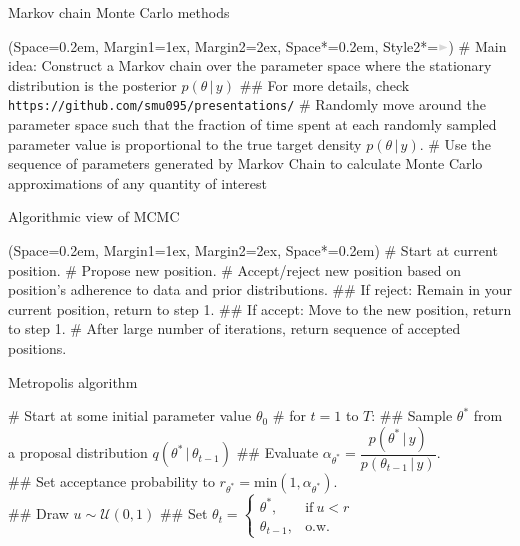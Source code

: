 \documentclass[12pt, aspectratio=149]{beamer}
\newcommand{\listSpace}{0.2em}
\theoremstyle{plain}
\begin{document}
\begin{frame}[fragile]{Markov chain Monte Carlo methods}
	\begin{easylist}
		\ListProperties(Space=\listSpace, Margin1=1ex, Margin2=2ex, Space*=\listSpace, Style2*=$\color{bggraydark}\blacktriangleright$\space)
		# Main idea: Construct a Markov chain over the parameter space where the stationary distribution is the posterior $p(\theta \,\vert\, y)$
		## For more details, check \footnotesize\texttt{https://github.com/smu095/presentations/}
		# Randomly move around the parameter space such that the fraction of time spent at each randomly sampled parameter value is proportional to the true target density $p(\theta \,\vert\,y)$.
		# Use the sequence of parameters generated by Markov Chain to calculate Monte Carlo approximations of any quantity of interest
	\end{easylist}
\end{frame}

\begin{frame}[fragile]{Algorithmic view of MCMC}
	\begin{easylist}[enumerate]
		\ListProperties(Space=\listSpace, Margin1=1ex, Margin2=2ex, Space*=\listSpace)
		# Start at current position.
		# Propose new position.
		# Accept/reject new position based on position's adherence to data and prior distributions.
		## If reject: Remain in your current position, return to step 1.
		## If accept: Move to the new position, return to step 1.
		# After large number of iterations, return sequence of accepted positions.
	\end{easylist}
\end{frame}

\begin{frame}[fragile]{Metropolis algorithm}
	\begin{easylist}[enumerate]
		# Start at some initial parameter value $\theta_0$
		# for $t=1$ to $T$:
		## Sample $\theta^*$ from a proposal distribution $q(\theta^* \, \vert \, \theta_{t-1})$
		## Evaluate $\alpha_{\theta^*}= \dfrac{p(\theta^* \, \vert \, y)}{p(\theta_{t-1} \, \vert \, y)}$.\\
		## Set acceptance probability to $r_{\theta^*}= \text{min}(1, \alpha_{\theta^*})$.\\
		## Draw $u \sim \mathcal{U}(0, 1)$
		## Set $\theta_t = \begin{cases}\theta^*, &\text{if}\ u < r \\ \theta_{t-1}, &\text{o.w.}\ \end{cases}$
	\end{easylist}
\end{frame}
\end{document}
